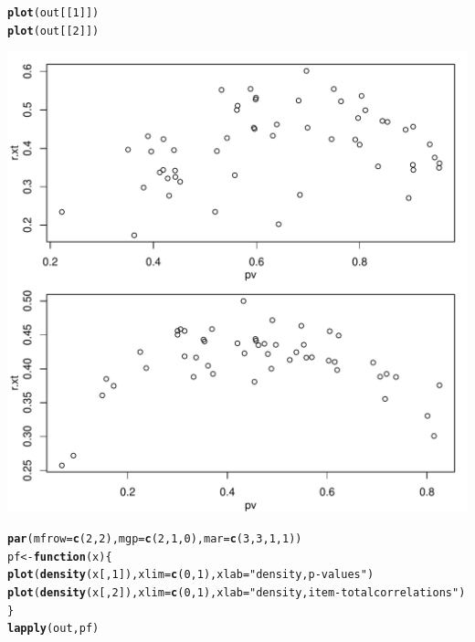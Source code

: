 \documentclass[letterpaper,12pt]{article}\usepackage[]{graphicx}\usepackage[]{color}
\makeatletter
\def\maxwidth{ %
  \ifdim\Gin@nat@width>\linewidth
    \linewidth
  \else
    \Gin@nat@width
  \fi
}
\newcommand{\hlnum}[1]{\textcolor[rgb]{0.686,0.059,0.569}{#1}}%
\newcommand{\hlstr}[1]{\textcolor[rgb]{0.192,0.494,0.8}{#1}}%
\newcommand{\hlstd}[1]{\textcolor[rgb]{0.345,0.345,0.345}{#1}}%
\newcommand{\hlkwa}[1]{\textcolor[rgb]{0.161,0.373,0.58}{\textbf{#1}}}%
\newcommand{\hlkwb}[1]{\textcolor[rgb]{0.69,0.353,0.396}{#1}}%
\newcommand{\hlkwc}[1]{\textcolor[rgb]{0.333,0.667,0.333}{#1}}%
\newcommand{\hlkwd}[1]{\textcolor[rgb]{0.737,0.353,0.396}{\textbf{#1}}}%
\newenvironment{kframe}{%
 \def\at@end@of@kframe{}%
 \ifinner\ifhmode%
  \def\at@end@of@kframe{\end{minipage}}%
  \begin{minipage}{\columnwidth}%
 \fi\fi%
 \def\FrameCommand##1{\hskip\@totalleftmargin \hskip-\fboxsep
 \colorbox{shadecolor}{##1}\hskip-\fboxsep
     \hskip-\linewidth \hskip-\@totalleftmargin \hskip\columnwidth}%
 \MakeFramed {\advance\hsize-\width
   \@totalleftmargin\z@ \linewidth\hsize
   \@setminipage}}%
 {\par\unskip\endMakeFramed%
 \at@end@of@kframe}
\newenvironment{knitrout}{}{} %
\numberwithin{equation}{section}
\makeatother
\begin{document}
\begin{knitrout}
\begin{kframe}
\begin{alltt}
\hlkwd{plot}\hlstd{(out[[}\hlnum{1}\hlstd{]])}
\hlkwd{plot}\hlstd{(out[[}\hlnum{2}\hlstd{]])}
\end{alltt}
\end{kframe}
\includegraphics[width=\maxwidth]{figure/unnamed-chunk-13-1} 
\begin{kframe}\begin{alltt}
\hlkwd{par}\hlstd{(}\hlkwc{mfrow}\hlstd{=}\hlkwd{c}\hlstd{(}\hlnum{2}\hlstd{,}\hlnum{2}\hlstd{),}\hlkwc{mgp}\hlstd{=}\hlkwd{c}\hlstd{(}\hlnum{2}\hlstd{,}\hlnum{1}\hlstd{,}\hlnum{0}\hlstd{),}\hlkwc{mar}\hlstd{=}\hlkwd{c}\hlstd{(}\hlnum{3}\hlstd{,}\hlnum{3}\hlstd{,}\hlnum{1}\hlstd{,}\hlnum{1}\hlstd{))}
\hlstd{pf}\hlkwb{<-}\hlkwa{function}\hlstd{(}\hlkwc{x}\hlstd{) \{}
    \hlkwd{plot}\hlstd{(}\hlkwd{density}\hlstd{(x[,}\hlnum{1}\hlstd{]),}\hlkwc{xlim}\hlstd{=}\hlkwd{c}\hlstd{(}\hlnum{0}\hlstd{,}\hlnum{1}\hlstd{),}\hlkwc{xlab}\hlstd{=}\hlstr{"density, p-values"}\hlstd{)}
    \hlkwd{plot}\hlstd{(}\hlkwd{density}\hlstd{(x[,}\hlnum{2}\hlstd{]),}\hlkwc{xlim}\hlstd{=}\hlkwd{c}\hlstd{(}\hlnum{0}\hlstd{,}\hlnum{1}\hlstd{),}\hlkwc{xlab}\hlstd{=}\hlstr{"density, item-total correlations"}\hlstd{)}
\hlstd{\}}
\hlkwd{lapply}\hlstd{(out,pf)}
\end{alltt}
\end{kframe}

\end{knitrout}
\end{document}
